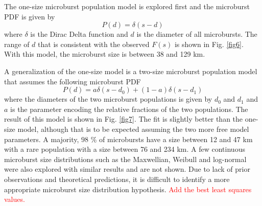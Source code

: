 \documentclass[draft]{agujournal2019}
\begin{document}
The one-size microburst population model is explored first and the microburst PDF is given by 
\begin{equation}
P(d) = \delta(s-d)
\end{equation} where $\delta$ is the Dirac Delta function and $d$ is the diameter of all microbursts. The range of $d$ that is consistent with the observed $F(s)$ is shown in Fig. \ref{fig6}. With this model, the microburst size is between 38 and 129 km. 

A generalization of the one-size model is a two-size microburst population model that assumes the following microburst PDF
\begin{equation}
P(d) = a \delta(s-d_0) + (1-a)\delta(s-d_1)
\end{equation} where the diameters of the two microburst populations is given by $d_0$ and $d_1$ and $a$ is the parameter encoding the relative fractions of the two populations. The result of this model is shown in Fig. \ref{fig7}. The fit is slightly better than the one-size model, although that is to be expected assuming the two more free model parameters. A majority, $98$ \% of microbursts have a size between 12 and 47 km with a rare population with a size between 76 and 234 km. A few continuous microburst size distributions such as the Maxwellian, Weibull and log-normal were also explored with similar results and are not shown. Due to lack of prior observations and theoretical predictions, it is difficult to identify a more appropriate microburst size distribution hypothesis. \textcolor{red}{Add the best least squares values.}
\end{document}
